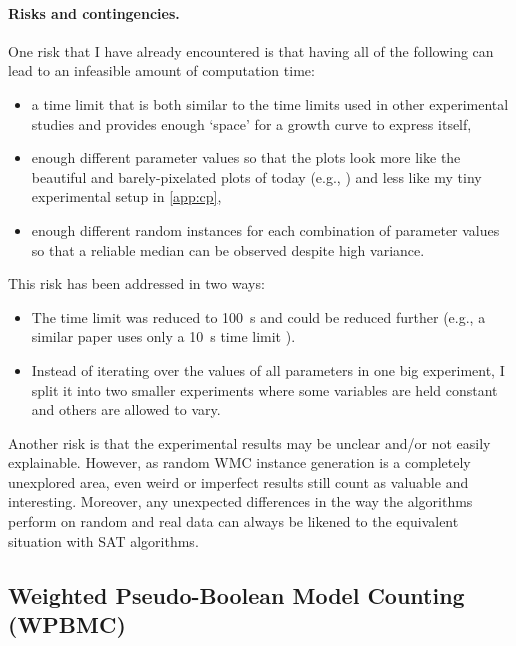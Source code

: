 \documentclass{article}
\begin{document}
\paragraph{Risks and contingencies.} One risk that I have already encountered is
that having all of the following can lead to an infeasible amount of computation
time:
\begin{itemize}
\item a time limit that is both similar to the time limits used in other
  experimental studies and provides enough `space' for a growth curve to express
  itself,
\item enough different parameter values so that the plots look more like the
  beautiful and barely-pixelated plots of today (e.g.,
  \cite{DBLP:conf/cp/McCreeshPP19,DBLP:journals/jair/McCreeshPST18}) and less
  like my tiny experimental setup in \cref{app:cp},
\item enough different random instances for each combination of parameter values
  so that a reliable median can be observed despite high variance.
\end{itemize}
This risk has been addressed in two ways:
\begin{itemize}
\item The time limit was reduced to \SI{100}{\second} and could be reduced
  further (e.g., a similar paper uses only a \SI{10}{\second} time limit
  \cite{DBLP:conf/ijcai/DudekMV17}).
\item Instead of iterating over the values of all parameters in one big
  experiment, I split it into two smaller experiments where some variables are
  held constant and others are allowed to vary.
\end{itemize}
Another risk is that the experimental results may be unclear and/or not easily
explainable. However, as random WMC instance generation is a completely
unexplored area, even weird or imperfect results still count as valuable and
interesting. Moreover, any unexpected differences in the way the algorithms
perform on random and real data can always be likened to the equivalent
situation with SAT algorithms.

\subsection{Weighted Pseudo-Boolean Model Counting (WPBMC)} \label{sec:2}
\end{document}

